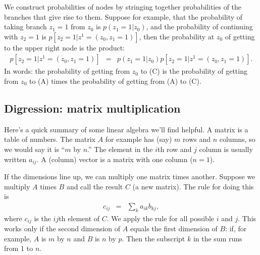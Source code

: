 \documentclass[11pt]{article}
\begin{document}
We construct probabilities of nodes by stringing together probabilities
of the branches that give rise to them.
Suppose for example, that the probability of
taking branch $z_1=1$ from $z_0$ is $p(z_1=1| z_0)$,
and the probability of continuing with $z_2 = 1$ is $p[z_2=1 | z^1 = (z_0, z_1=1) ]$,
then the probability at $z_0$ of getting to the upper right node is the product:
\begin{eqnarray*}
    p[z_2=1 | z^1 = (z_0, z_1=1) ] &=& p(z_1=1| z_0) p[z_2=1 | z^1 = (z_0, z_1=1) ] .
\end{eqnarray*}
In words:  the probability of getting from $z_0$ to (C)
is the probability of getting from $z_0$ to (A)
times the probability of getting from (A) to (C).



\subsection*{Digression:  matrix multiplication}

Here's a quick summary of some linear algebra we'll find helpful.
A matrix is a table of numbers.
The matrix $A$ for example has (say) $m$ rows and $n$ columns,
so we would say it is ``$m$ by $n$.''
The element in the $i$th row and $j$ column is usually written $a_{ij}$.
A (column) vector is a matrix with one column ($n=1$).

If the dimensions line up, we can multiply
one matrix times another.
Suppose we multiply $A$ times $B$ and call the result $C$ (a new matrix).
The rule for doing this is
\begin{eqnarray*}
    c_{ij} &=& \sum_k a_{ik} b_{kj} ,
\end{eqnarray*}
where $c_{ij}$ is the $ij$th element of $C$.
We apply the rule for all possible $i$ and $j$.
This works only if the second dimension of $A$ equals the first dimension of $B$:
if, for example, $A$ is $m$ by $n$ and $B$ is $n$ by $p$.
Then the subscript $k$ in the sum runs from 1 to $n$.
\end{document}
